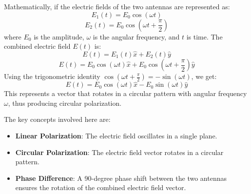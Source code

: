 Mathematically, if the electric fields of the two antennas are represented as:
\[
E_1(t) = E_0 \cos(\omega t)
\]
\[
E_2(t) = E_0 \cos\left(\omega t + \frac{\pi}{2}\right)
\]
where \(E_0\) is the amplitude, \(\omega\) is the angular frequency, and \(t\) is time. The combined electric field \(E(t)\) is:
\[
E(t) = E_1(t) \hat{x} + E_2(t) \hat{y}
\]
\[
E(t) = E_0 \cos(\omega t) \hat{x} + E_0 \cos\left(\omega t + \frac{\pi}{2}\right) \hat{y}
\]
Using the trigonometric identity \(\cos\left(\omega t + \frac{\pi}{2}\right) = -\sin(\omega t)\), we get:
\[
E(t) = E_0 \cos(\omega t) \hat{x} - E_0 \sin(\omega t) \hat{y}
\]
This represents a vector that rotates in a circular pattern with angular frequency \(\omega\), thus producing circular polarization.

The key concepts involved here are:
\begin{itemize}
    \item \textbf{Linear Polarization}: The electric field oscillates in a single plane.
    \item \textbf{Circular Polarization}: The electric field vector rotates in a circular pattern.
    \item \textbf{Phase Difference}: A 90-degree phase shift between the two antennas ensures the rotation of the combined electric field vector.
\end{itemize}

